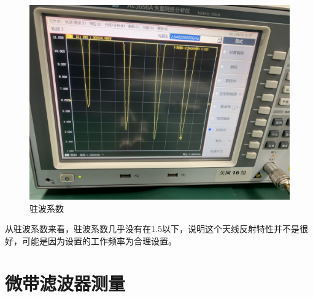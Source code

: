 \documentclass{../source/Experiment}
\begin{document}
\begin{figure}[H]
\begin{minipage}[t]{0.3\textwidth}
        \centering
        \includegraphics[width=1\textwidth]{pic/驻波系数}
        \caption{驻波系数}
    \end{minipage}
\end{figure}

从驻波系数来看，驻波系数几乎没有在1.5以下，说明这个天线反射特性并不是很好，可能是因为设置的工作频率为合理设置。

\section{微带滤波器测量}
\end{document}
